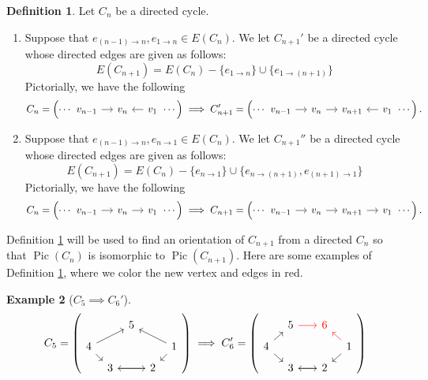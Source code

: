 \documentclass[11pt,reqno]{amsart}
\DeclareMathOperator{\Pic}{Pic}
\theoremstyle{definition}
\newtheorem{mydef}{Definition}[section]
\newtheorem{myeg}[mydef]{Example}
\theoremstyle{plain}
\begin{document}
\begin{mydef}\label{definition: embedding}
Let $C_n$ be a directed cycle. 
\begin{enumerate}
	\item 
Suppose that $e_{(n-1)\to n}, e_{1\to n} \in E(C_n)$. We let $C_{n+1}'$ be a directed cycle whose directed edges are given as follows:
\[
E(C_{n+1}) = E(C_n) - \{e_{1\to n}\} \cup \{e_{1\to (n+1)}\}
\]
Pictorially, we have the following
\[
	C_n= \left( \cdots \begin{tikzcd}[column sep=0.4cm]
		v_{n-1} \arrow[r] & v_n & v_1 \arrow[l] 
	\end{tikzcd} \cdots \right)
	\implies
	C_{n+1}'= \left( \cdots \begin{tikzcd}[column sep=0.4cm]
		v_{n-1} \arrow[r] & v_n \arrow[r] & v_{n+1} &  v_1 \arrow[l] 
	\end{tikzcd} \cdots \right).
\]
\item 
Suppose that $e_{(n-1)\to n}, e_{n\to 1} \in E(C_n)$. We let $C_{n+1}''$ be a directed cycle whose directed edges are given as follows:
\[
E(C_{n+1}) = E(C_n) - \{e_{n\to 1}\} \cup \{e_{n\to (n+1)}, e_{(n+1)\to 1} \}
\]
Pictorially, we have the following
\[
C_n=\left( \cdots \begin{tikzcd}[column sep=0.4cm]
	v_{n-1} \arrow[r] & v_n \arrow[r] & v_1 
\end{tikzcd} \cdots \right)
\implies
C_{n+1}= \left( \cdots \begin{tikzcd}[column sep=0.4cm]
	v_{n-1} \arrow[r] & v_n \arrow[r] & v_{n+1} \arrow[r] & v_1 
\end{tikzcd} \cdots \right).
\]
\end{enumerate}
\end{mydef}

Definition \ref{definition: embedding} will be used to find an orientation of $C_{n+1}$ from a directed $C_n$ so that $\Pic(C_n)$ is isomorphic to $\Pic(C_{n+1})$. Here are some examples of Definition \ref{definition: embedding}, where we color the new vertex and edges in red. 

\begin{myeg}[$C_5 \implies C_6'$]

\[
C_5=\left( \begin{tikzcd}[row sep=0.2cm, column sep=0.2cm]
	& & 5  & &  \\ 
	4 \arrow[urr] \arrow[dr] & & & & 1 \arrow[dl]\arrow[ull] \\ 
	& 3 \arrow[rr] & & 2 \arrow[ll]& 
\end{tikzcd}\right)	
\implies C_6'= \left( \begin{tikzcd}[row sep=0.2cm, column sep=0.3cm]
	& 5 \arrow[rr,red]&  &\textcolor{red}{6} &  \\ 
	4  \arrow[dr] \arrow[ur] & & & & 1 \arrow[dl] \arrow[ul,red] \\ 
	& 3 \arrow[rr] & & 2 \arrow[ll]& 
\end{tikzcd}\right)	
\] 
\end{myeg}
\end{document}
